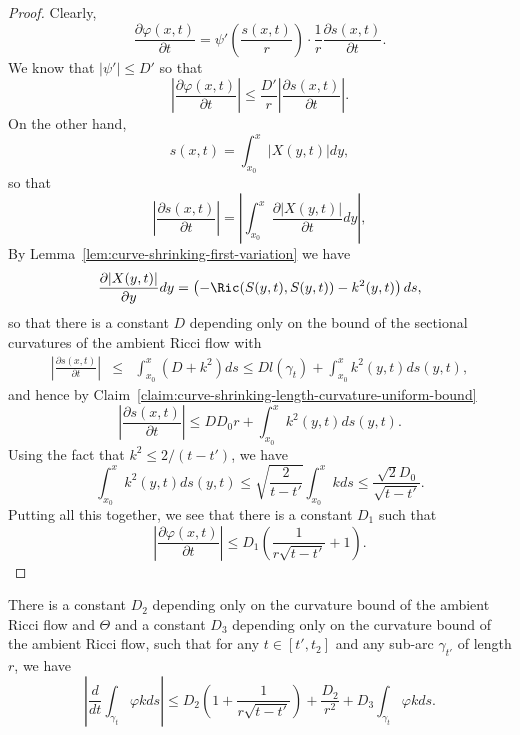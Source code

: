 \begin{proof}
Clearly,
$$\frac{\partial \varphi(x,t)}{\partial
t}=\psi'\left(\frac{s(x,t)}{r}\right)\cdot \frac{1}{r}\frac{\partial
s(x,t)}{\partial t}.$$ We know that $|\psi'|\le D'$ so that
$$\left|\frac{\partial \varphi(x,t)}{\partial
t}\right|\le \frac{D'}{r}\left|\frac{\partial s(x,t)}{\partial
t}\right|.$$ On the other hand,
$$s(x,t)=\int_{x_0}^x|X(y,t)|dy,$$
so that  $$ \left|\frac{\partial s(x,t)}{\partial t}\right| =
\left|\int_{x_0}^x\frac{\partial |X(y,t)|}{\partial t}dy\right|,$$
By Lemma~\ref{lem:curve-shrinking-first-variation} we have $$\frac{\partial
|X(y,t)|}{\partial y}dy  = \left(-\Ric(S(y,t),S(y,t))-k^2(y,t)\right)ds,$$
 so that there is a constant $D$ depending only on the bound of the
sectional curvatures of the ambient Ricci flow with
\begin{eqnarray*}\left|\frac{\partial s(x,t)}{\partial t}\right| &
\le &  \int_{x_0}^x(D+k^2)ds\le
Dl(\gamma_t)+\int_{x_0}^xk^2(y,t)ds(y,t), \end{eqnarray*} and hence
by Claim~\ref{claim:curve-shrinking-length-curvature-uniform-bound}
$$\left|\frac{\partial s(x,t)}{\partial t}\right|\le
  DD_0r+
\int_{x_0}^xk^2(y,t)ds(y,t).$$
  Using
the fact that $k^2\le 2/(t-t')$,  we have
$$\int_{x_0}^xk^2(y,t)ds(y,t)\le\sqrt{\frac{2}{t-t'}}\int_{x_0}^xkds\le
\frac{\sqrt{2}D_0}{\sqrt{t-t'}}.$$ Putting all this together, we see
that there is a constant $D_1$ such that
$$\left|\frac{\partial \varphi(x,t)}{\partial t}\right|\le
D_1(\frac{1}{r\sqrt{t-t'}}+1).$$
\end{proof}



\begin{claim}
\label{claim:cutoff-weighted-curvature-integral-bound}
\label{claim1885}
There is a constant $D_2$ depending only on the curvature bound of
the ambient Ricci flow and $\Theta$ and a constant $D_3$ depending
only on the curvature bound of the ambient Ricci flow, such that for
any $t\in [t',t_2]$ and any sub-arc $\gamma_{t'}$ of length $r$, we
have
$$\left|\frac{d}{dt}\int_{\gamma_t}\varphi
kds\right|\le
D_2\left(1+\frac{1}{r\sqrt{t-t'}}\right)+\frac{D_2}{r^2}+D_3\int_{\gamma_t}\varphi
kds.$$
\end{claim}


